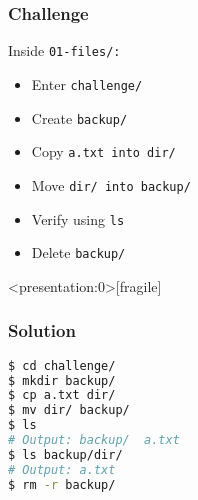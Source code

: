 \begin{frame}
\frametitle{Challenge}
Inside \tt{01-files/}:
\begin{itemize}
    \item Enter \tt{challenge/}
    \item Create \tt{backup/}
    \item Copy \tt{a.txt} into \tt{dir/}
    \item Move \tt{dir/} into \tt{backup/}
    \item Verify using \tt{ls}
    \item Delete \tt{backup/}
\end{itemize}
\end{frame}

\begin{frame}<presentation:0>[fragile]
\frametitle{Solution}
\begin{lstlisting}[language=bash]
$ cd challenge/
$ mkdir backup/
$ cp a.txt dir/
$ mv dir/ backup/
$ ls
# Output: backup/  a.txt
$ ls backup/dir/
# Output: a.txt
$ rm -r backup/
\end{lstlisting}
\end{frame}

